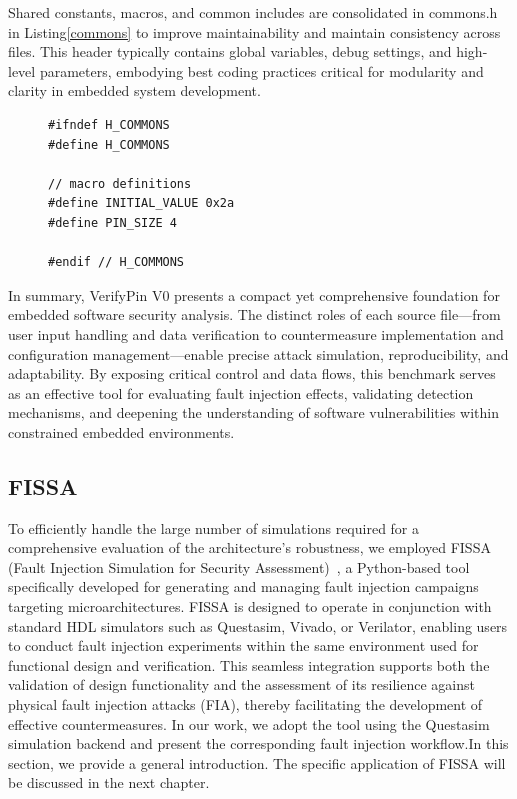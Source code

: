 Shared constants, macros, and common includes are consolidated in commons.h in Listing\ref{commons} to improve maintainability and maintain consistency across files. This header typically contains global variables, debug settings, and high-level parameters, embodying best coding practices critical for modularity and clarity in embedded system development.
\begin{figure}
\begin{lstlisting}[caption={commons.c of VerifyPin function in benchmark V0}, label={commons}, basicstyle=\ttfamily\footnotesize]
#ifndef H_COMMONS
#define H_COMMONS

// macro definitions
#define INITIAL_VALUE 0x2a
#define PIN_SIZE 4

#endif // H_COMMONS
\end{lstlisting}
\end{figure}
In summary, VerifyPin V0 presents a compact yet comprehensive foundation for embedded software security analysis. The distinct roles of each source file—from user input handling and data verification to countermeasure implementation and configuration management—enable precise attack simulation, reproducibility, and adaptability. By exposing critical control and data flows, this benchmark serves as an effective tool for evaluating fault injection effects, validating detection mechanisms, and deepening the understanding of software vulnerabilities within constrained embedded environments.

\subsection{FISSA}
To efficiently handle the large number of simulations required for a comprehensive evaluation of the architecture's robustness, we employed FISSA (Fault Injection Simulation for Security Assessment)~\cite{PLG-24-dsd}, a Python-based tool specifically developed for generating and managing fault injection campaigns targeting microarchitectures. FISSA is designed to operate in conjunction with standard HDL simulators such as Questasim, Vivado, or Verilator, enabling users to conduct fault injection experiments within the same environment used for functional design and verification. This seamless integration supports both the validation of design functionality and the assessment of its resilience against physical fault injection attacks (FIA), thereby facilitating the development of effective countermeasures. In our work, we adopt the tool using the Questasim simulation backend and present the corresponding fault injection workflow.In this section, we provide a general introduction. The specific application of FISSA will be discussed in the next chapter.

